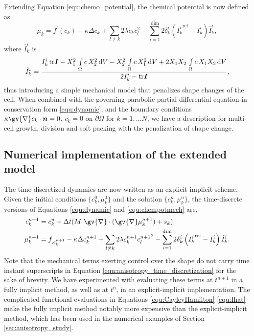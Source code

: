 \documentclass{article}
\newcommand{\grad}[1]{\gv{\nabla} #1}
\def\bI{\mbox{\boldmath$ I$}}
\def\bn{\mbox{\boldmath$ n$}}
\begin{document}
Extending Equation \eqref{equ:chemo_potential}, the chemical potential is now defined as
\begin{equation}
\mu_k  = f^\prime(c_k) -  \kappa \Delta c_k + \sum_{l\ne k}2\lambda  c_k c_l^2 - \sum_{i=1}^{\text{dim}} 2\delta_k^i \left({I_k^i} ^\text{ref} - I_k^i\right)\hat{I}^i_k,
\label{equ:chempotmech}
\end{equation}
where $\hat{I}^i_k$ is
\begin{equation}
    \hat{I}^i_k = \frac{I^i_k\,\text{tr}\bar{\bI} - \bar{X}_1^2\,\int\limits_\Omega c\,\bar{X}_2^2\,\text{d}V - \bar{X}_2^2\,\int\limits_\Omega c\,\bar{X}_1^2\,\text{d}V+ 2\bar{X}_1\bar{X}_2\,\int\limits_\Omega c\,\bar{X}_1\bar{X}_2\,\text{d}V}{2 I^i_k - \text{tr}\bI},
    \label{equ:Ihat}
\end{equation}
thus introducing a simple mechanical model that penalizes shape changes of the cell. When combined with the governing parabolic partial differential equation in conservation form \eqref{equ:dynamic}, and the boundary conditions $\kappa \grad c_k \cdot \bn = 0$, $c_k=0$ on $\partial\Omega$ for $k = 1,\dots N$, we have a description for multi-cell growth, division and soft packing with the penalization of shape change. 

\subsection{Numerical implementation of the extended model}
The time discretized dynamics are now written as an explicit-implicit scheme. Given the initial conditions $\{c_k^0,\mu_k^0\}$ and the solution $\{c_k^n,\mu_k^n\}$, the time-discrete versions of Equations \eqref{equ:dynamic} and \eqref{equ:chempotmech} are,
\begin{align}
c^{n+1}_{k} &= c^{n}_{k} + \Delta t (M~\grad \cdot (\grad \mu^{n+1}_{k})+s_{k})\nonumber\\
\mu_k^{n+1}  &= f_{,c_k^{n+1}} -  \kappa \Delta c_k^{n+1} + \sum_{l\ne k}2\lambda  c_k^{n+1} {c_l^{n+1}}^2 - \sum_{i=1}^{\text{dim}} 2\delta_k^i \left({I_k^i} ^\text{ref} - I_k^i\right)\hat{I}^i_k.
\label{equ:anisotropy_time_discretization}
\end{align}
Note that the mechanical terms exerting control over the shape do not carry time instant superscripts in Equation \eqref{equ:anisotropy_time_discretization} for the sake of brevity. We have experimented with evaluating these terms at $t^{n+1}$ in a fully implicit method, as well as at $t^n$, in an explicit-implicit implementation. The complicated functional evaluations in Equations \eqref{equ:CayleyHamilton}-\eqref{equ:Ihat} make the fully implicit method notably more expensive than the explicit-implicit method, which has been used in the numerical examples of Section \ref{sec:anisotropy_study}.
\end{document}

